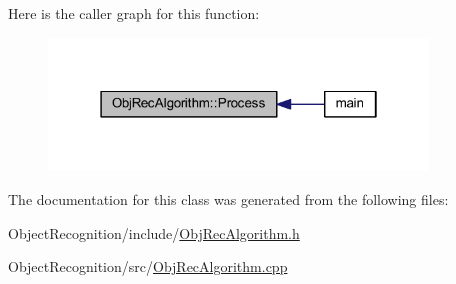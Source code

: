 Here is the caller graph for this function\-:
\nopagebreak
\begin{figure}[H]
\begin{center}
\leavevmode
\includegraphics[width=286pt]{class_obj_rec_algorithm_a66ef61bfa87fdce6bf270948636d61a9_icgraph}
\end{center}
\end{figure}




The documentation for this class was generated from the following files\-:\begin{DoxyCompactItemize}
\item 
Object\-Recognition/include/\hyperlink{_obj_rec_algorithm_8h}{Obj\-Rec\-Algorithm.\-h}\item 
Object\-Recognition/src/\hyperlink{_obj_rec_algorithm_8cpp}{Obj\-Rec\-Algorithm.\-cpp}\end{DoxyCompactItemize}
